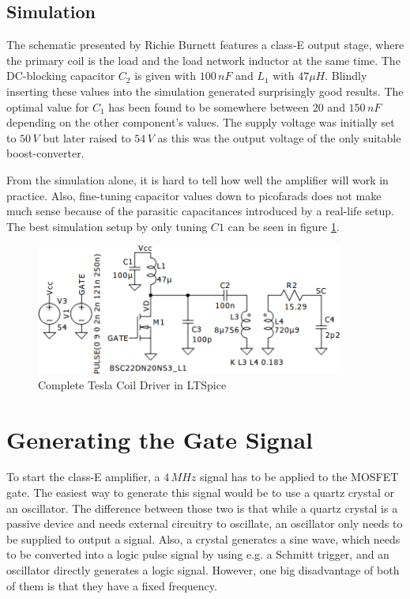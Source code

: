 \subsection{Simulation}

The schematic presented by Richie Burnett features a class-E output stage, where the primary coil is the load and the load network inductor at the same time. The DC-blocking capacitor \(C_2\) is given with \(100\,nF\) and \(L_1\) with \(47\mu H\). Blindly inserting these values into the simulation generated surprisingly good results. The optimal value for \(C_1\) has been found to be somewhere between \(20\) and \(150\,nF\) depending on the other component's values. The supply voltage was initially set to \(50\,V\) but later raised to \(54\,V\) as this was the output voltage of the only suitable boost-converter.

From the simulation alone, it is hard to tell how well the amplifier will work in practice. Also, fine-tuning capacitor values down to picofarads does not make much sense because of the parasitic capacitances introduced by a real-life setup. The best simulation setup by only tuning \(C1\) can be seen in figure \ref{fig:ltspice-complete}.

\begin{figure}[h!]
    \centering
    \includegraphics[width=0.9\textwidth]{simon/resources/ltspice-complete.png}
    \caption{Complete Tesla Coil Driver in LTSpice}
    \label{fig:ltspice-complete}
\end{figure}

\section{Generating the Gate Signal} %

To start the class-E amplifier, a \(4\,MHz\) signal has to be applied to the MOSFET gate. The easiest way to generate this signal would be to use a quartz crystal or an oscillator. The difference between those two is that while a quartz crystal is a passive device and needs external circuitry to oscillate, an oscillator only needs to be supplied to output a signal. Also, a crystal generates a sine wave, which needs to be converted into a logic pulse signal by using e.g. a Schmitt trigger, and an oscillator directly generates a logic signal. However, one big disadvantage of both of them is that they have a fixed frequency.

